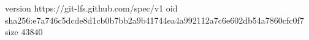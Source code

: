version https://git-lfs.github.com/spec/v1
oid sha256:e7a746c5dcde8d1cb0b7bb2a9b41744ea4a992112a7c6e602db54a7860cfc0f7
size 43840
